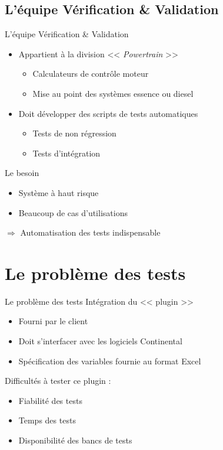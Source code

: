 \documentclass{beamer}
\begin{document}
\subsection{L'\'equipe V\'erification \& Validation}
\begin{frame}{L'\'equipe V\'erification \& Validation}

	\begin{itemize}

		\item Appartient à la division << \textit{Powertrain} >>
			\begin{itemize}
				\item Calculateurs de contrôle moteur
				\item Mise au point des systèmes essence ou diesel
			\end{itemize}
	\end{itemize}
	
	\begin{itemize}
			\pause
		\item Doit développer des scripts de tests automatiques
			\begin{itemize}
				\item Tests de non régression
				\item Tests d'intégration
			\end{itemize}
	\end{itemize}
	\vfill
	\pause
	\begin{block}{Le besoin}
		\begin{itemize}
			\item Système à haut risque 
			\item Beaucoup de cas d'utilisations 
		\end{itemize}
	\end{block}
	\pause
	\hspace{30px} $\Rightarrow$ Automatisation des tests indispensable
\end{frame}
\section{Le probl\`eme des tests}
\begin{frame}{Le problème des tests}
	Intégration du << plugin >>
	\vspace{-10px}
			\begin{itemize}
				\item Fourni par le client
				\item Doit s'interfacer avec les logiciels Continental 
				\item Spécification des variables fournie au format Excel
			\end{itemize}
			\pause
	Difficultés à tester ce plugin : 
	\vspace{-10px}
	\begin{itemize}
		\item Fiabilité des tests
		\item Temps des tests
		\item Disponibilité des bancs de tests
	\end{itemize}
\end{frame}
\end{document}
